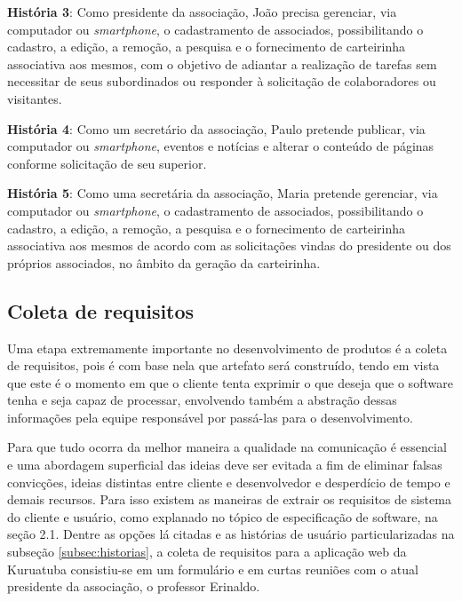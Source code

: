 \textbf{História 3}: Como presidente da associação, João precisa gerenciar, via computador ou \textit{smartphone}, o cadastramento de associados, possibilitando o cadastro, a edição, a remoção, a pesquisa e o fornecimento de carteirinha associativa aos mesmos, com o objetivo de adiantar a realização de tarefas sem necessitar de seus subordinados ou responder à solicitação de colaboradores ou visitantes.

\textbf{História 4}: Como um secretário da associação, Paulo pretende publicar, via computador ou \textit{smartphone}, eventos e notícias e alterar o conteúdo de páginas conforme solicitação de seu superior. 

\textbf{História 5}: Como uma secretária da associação, Maria pretende gerenciar, via computador ou \textit{smartphone}, o cadastramento de associados, possibilitando o cadastro, a edição, a remoção, a pesquisa e o fornecimento de carteirinha associativa aos mesmos de acordo com as solicitações vindas do presidente ou dos próprios associados, no âmbito da geração da carteirinha.

\hspace{2.5cm}
\subsection{Coleta de requisitos}
\label{subsec:requisitos}
\hspace{2.5cm}

Uma etapa extremamente importante no desenvolvimento de produtos é a coleta de requisitos, pois é com base nela que artefato será construído, tendo em vista que este é o momento em que o cliente tenta exprimir o que deseja que o software tenha e seja capaz de processar, envolvendo também a abstração dessas informações pela equipe responsável por passá-las para o desenvolvimento. 

Para que tudo ocorra da melhor maneira a qualidade na comunicação é essencial e uma abordagem superficial das ideias deve ser evitada a fim de eliminar falsas convicções, ideias distintas entre cliente e desenvolvedor e desperdício de tempo e demais recursos. Para isso existem as maneiras de extrair os requisitos de sistema do cliente e usuário, como explanado no tópico de especificação de software, na seção 2.1. Dentre as opções lá citadas e as histórias de usuário particularizadas na subseção \ref{subsec:historias}, a coleta de requisitos para a aplicação web da Kuruatuba consistiu-se em um formulário e em curtas reuniões com o atual presidente da associação, o professor Erinaldo. 

